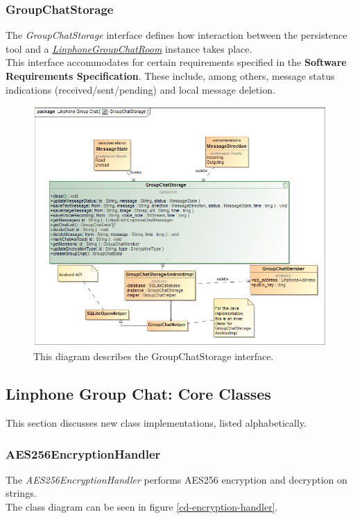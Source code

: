 \documentclass[11pt]{article}
\begin{document}
\subsubsection{GroupChatStorage}
The \textit{GroupChatStorage} interface defines how interaction between the persistence tool and a \textit{ \hyperref[subsubsec: linphonegroupchatroom]{LinphoneGroupChatRoom}} instance takes place.\\
This interface accommodates for certain requirements specified in the \textbf{Software Requirements Specification}. These include, among others, message status indications (received/sent/pending) and local message deletion.
\begin{figure}[H]
\centering
\includegraphics[width=5in]{./images/class_chat_storage.png}
\caption[GroupChatStorage Class Diagram]{This diagram describes the GroupChatStorage interface.}
\label{cd-chat-storage}
\end{figure}
\subsection{Linphone Group Chat: Core Classes}
This section discusses new class implementations, listed alphabetically.
\subsubsection{AES256EncryptionHandler}
The \textit{AES256EncryptionHandler} performs AES256 encryption and decryption on strings.\\
The class diagram can be seen in figure \ref{cd-encryption-handler}.
\end{document}
